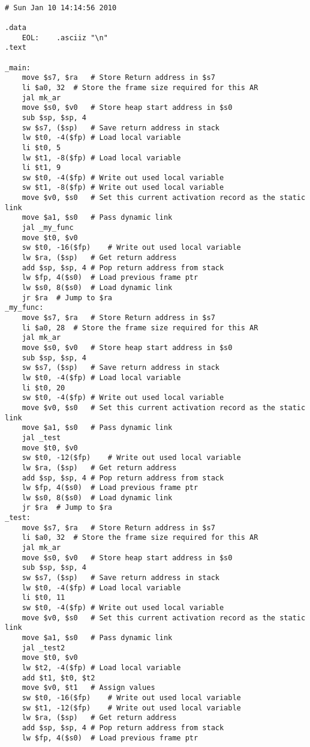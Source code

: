 \begin{lstlisting}[showstringspaces=false,breaklines=true,backgroundcolor=\color{light-gray}, captionpos=b]
         
# Sun Jan 10 14:14:56 2010

.data
	EOL:	.asciiz "\n"
.text

_main:
	move $s7, $ra	# Store Return address in $s7
	li $a0, 32	# Store the frame size required for this AR
	jal mk_ar
	move $s0, $v0	# Store heap start address in $s0
	sub $sp, $sp, 4
	sw $s7, ($sp)	# Save return address in stack
	lw $t0, -4($fp)	# Load local variable
	li $t0, 5
	lw $t1, -8($fp)	# Load local variable
	li $t1, 9
	sw $t0, -4($fp)	# Write out used local variable
	sw $t1, -8($fp)	# Write out used local variable
	move $v0, $s0	# Set this current activation record as the static link
	move $a1, $s0	# Pass dynamic link
	jal _my_func
	move $t0, $v0
	sw $t0, -16($fp)	# Write out used local variable
	lw $ra, ($sp)	# Get return address
	add $sp, $sp, 4	# Pop return address from stack
	lw $fp, 4($s0)	# Load previous frame ptr
	lw $s0, 8($s0)	# Load dynamic link
	jr $ra	# Jump to $ra
_my_func:
	move $s7, $ra	# Store Return address in $s7
	li $a0, 28	# Store the frame size required for this AR
	jal mk_ar
	move $s0, $v0	# Store heap start address in $s0
	sub $sp, $sp, 4
	sw $s7, ($sp)	# Save return address in stack
	lw $t0, -4($fp)	# Load local variable
	li $t0, 20
	sw $t0, -4($fp)	# Write out used local variable
	move $v0, $s0	# Set this current activation record as the static link
	move $a1, $s0	# Pass dynamic link
	jal _test
	move $t0, $v0
	sw $t0, -12($fp)	# Write out used local variable
	lw $ra, ($sp)	# Get return address
	add $sp, $sp, 4	# Pop return address from stack
	lw $fp, 4($s0)	# Load previous frame ptr
	lw $s0, 8($s0)	# Load dynamic link
	jr $ra	# Jump to $ra
_test:
	move $s7, $ra	# Store Return address in $s7
	li $a0, 32	# Store the frame size required for this AR
	jal mk_ar
	move $s0, $v0	# Store heap start address in $s0
	sub $sp, $sp, 4
	sw $s7, ($sp)	# Save return address in stack
	lw $t0, -4($fp)	# Load local variable
	li $t0, 11
	sw $t0, -4($fp)	# Write out used local variable
	move $v0, $s0	# Set this current activation record as the static link
	move $a1, $s0	# Pass dynamic link
	jal _test2
	move $t0, $v0
	lw $t2, -4($fp)	# Load local variable
	add $t1, $t0, $t2
	move $v0, $t1	# Assign values
	sw $t0, -16($fp)	# Write out used local variable
	sw $t1, -12($fp)	# Write out used local variable
	lw $ra, ($sp)	# Get return address
	add $sp, $sp, 4	# Pop return address from stack
	lw $fp, 4($s0)	# Load previous frame ptr

\end{lstlisting}
